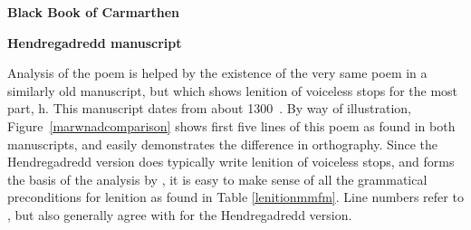 \begin{mwl}
 \item%
  \begin{minipage}{0.45\textwidth}
  \textbf{Black Book of Carmarthen}\\
  \end{minipage}
  \begin{minipage}{0.45\textwidth}
  \textbf{Hendregadredd manuscript}\\
  \end{minipage}
 \label{marwnadcomparison}
\end{mwl}


Analysis of the poem is helped by the existence of the very same poem in a similarly old manuscript, but which shows lenition of voiceless stops for the most part, \ie \gls{h}. This manuscript dates from about 1300~\autocite{huws_llawysgrif_1981}. By way of illustration, Figure~\ref{marwnadcomparison} shows first five lines of this poem as found in both manuscripts, and easily demonstrates the difference in orthography. Since the Hendregadredd version does typically write lenition of voiceless stops, and forms the basis of the analysis by \textcite[82--91]{jones_gwaith_1991}, it is easy to make sense of all the grammatical preconditions for lenition as found in Table \ref{lenitionmmfm}. Line numbers refer to \textcite[78-79]{jarman_llyfr_1982}, but also generally agree with \textcite[82--91]{jones_gwaith_1991} for the Hendregadredd version.

